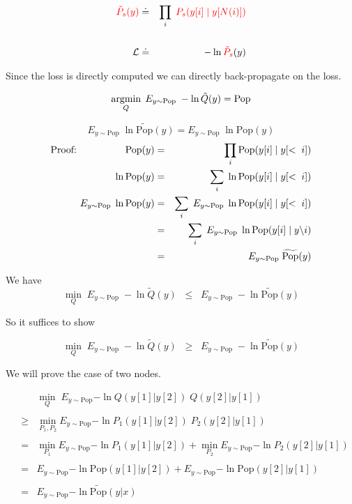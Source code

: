 {\vfill
\begin{eqnarray*}
  {\color{red} \tilde{P}_s(y)} & \doteq & \prod_i \;{\color{red} P_s(y[i] \;|\;y[N(i)])} \\
  \\
  {\cal L} & \doteq & - \ln {\color{red} \tilde{P}_s}(y)
\end{eqnarray*}

\vfill
Since the loss is directly computed we can directly back-propagate on the loss.



{\color{red} $$\operatorname*{argmin}_Q \; E_{y \sim \mathrm{Pop}} \;-\ln \tilde{Q}(y) = \mathrm{Pop}$$}

\vfill


{\color{red} $$E_{y \sim \mathrm{Pop}}\;\ln \widetilde{\mathrm{Pop}}(y) = E_{y \sim \mathrm{Pop}}\;\ln \mathrm{Pop}(y)$$}
{\huge
\begin{eqnarray*}
\mbox{Proof:}\hspace{5em}\mathrm{Pop}(y) & = & \prod_i \mathrm{Pop}(y[i]\;|\; y[<\;i]) \\
\ln \mathrm{Pop}(y) & = & \sum_i \; \ln \mathrm{Pop}(y[i]\;|\; y[<\;i]) \\
E_{y \sim \mathrm{Pop}}\;\ln \mathrm{Pop}(y) & = & \sum_i \;E_{y \sim \mathrm{Pop}} \; \ln \mathrm{Pop}(y[i]\;|\; y[<\;i]) \\
& = & \sum_i \;E_{y \sim \mathrm{Pop}} \;\ln \mathrm{Pop}(y[i]\;|\; y\backslash i) \\
& = & E_{y\sim \mathrm{Pop}}\;\widetilde{\mathrm{Pop}}(y)
\end{eqnarray*}
}

We have
$$\min_{Q} \;E_{y \sim \mathrm{Pop}}\;-\ln \tilde{Q}(y) \;\;\leq \;\; E_{y \sim \mathrm{Pop}}\;-\ln \widetilde{\mathrm{Pop}}(y)$$

\vfill
So it suffices to show

$$\min_{Q} \;E_{y \sim \mathrm{Pop}}\;-\ln \tilde{Q}(y) \;\;\geq \;\; E_{y \sim \mathrm{Pop}}\;-\ln \widetilde{\mathrm{Pop}}(y)$$


We will prove the case of two nodes.

\vfill
\begin{eqnarray*}
  & & \min_Q \;E_{y\sim \mathrm{Pop}}{-\ln Q(y[1]|y[2])\;Q(y[2]|y[1])} \\
  \\
  & \geq & \min_{P_1,P_2} E_{y \sim \mathrm{Pop}}{-\ln P_1(y[1]|y[2])\;P_2(y[2]|y[1])} \\
  \\
  & = & \min_{P_1} E_{y \sim \mathrm{Pop}}{-\ln P_1(y[1]|y[2])} + \min_{P_2} E_{y \sim \mathrm{Pop}}{-\ln P_2(y[2]|y[1])} \\
  \\
  & = & E_{y \sim \mathrm{Pop}}{-\ln \mathrm{Pop}(y[1]|y[2])} + E_{y \sim \mathrm{Pop}}{-\ln \mathrm{Pop}(y[2]|y[1])} \\
  \\
  & = & E_{y \sim \mathrm{Pop}}{-\ln \widetilde{\mathrm{Pop}}(y|x)}
\end{eqnarray*}

}
